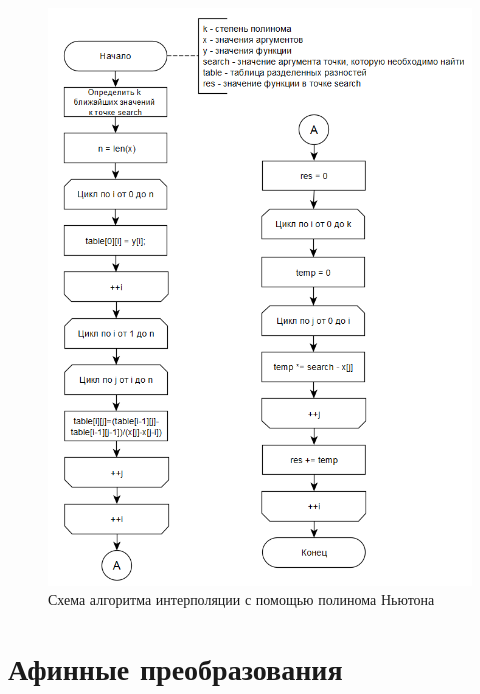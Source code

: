\documentclass[a4paper, 14pt]{extreport}
\begin{document}
\begin{figure}[h]
	\centering
	\includegraphics[scale=0.8]{tools/alg_nw.png}
	\caption{Схема алгоритма интерполяции с помощью полинома Ньютона}
	\label{constr:nw}
\end{figure}

\section{Афинные преобразования}
\end{document}
